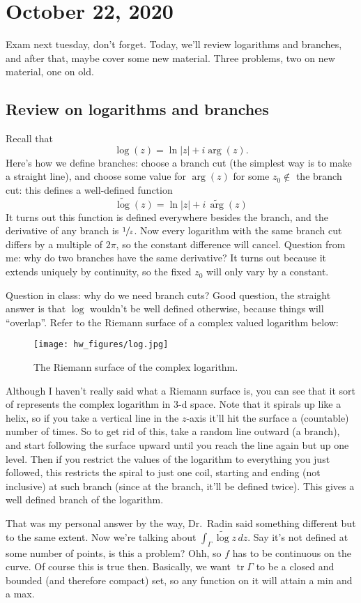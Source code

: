 \section{October 22, 2020}
Exam next tuesday, don't forget. Today, we'll review logarithms and branches, and after that, maybe cover some new material. Three problems, two on new material, one on old.
\subsection{Review on logarithms and branches}
Recall that \[
    \log(z)=\ln|z|+i \operatorname{arg}(z).
\] Here's how we define branches: choose a branch cut (the simplest way is to make a straight line), and choose some value for $\operatorname{arg}(z)$ for some $z_0\notin$ the branch cut: this defines a well-defined function \[
\widetilde{\log}(z)=\ln|z|+i\, \widetilde {\operatorname{arg}}(z)
\] It turns out this function is defined everywhere besides the branch, and the derivative of any branch is $\sfrac{1}{z}$. Now every logarithm with the same branch cut differs by a multiple of $2\pi$, so the constant difference will cancel. Question from me: why do two branches have the same derivative? It turns out because it extends uniquely by continuity, so the fixed $z_0$ will only vary by a constant.

Question in class: why do we need branch cuts? Good question, the straight answer is that $\log$ wouldn't be well defined otherwise, because things will ``overlap''. Refer to the Riemann surface of a complex valued logarithm below:
\begin{figure}[H]
\centering
        \texttt{[image: hw\_figures/log.jpg]}
        \caption{The Riemann surface of the complex logarithm.}
\end{figure}
Although I haven't really said what a Riemann surface is, you can see that it sort of represents the complex logarithm in $3$-d space. Note that it spirals up like a helix, so if you take a vertical line in the $z$-axis it'll hit the surface a (countable) number of times. So to get rid of this, take a random line outward (a branch), and start following the surface upward until you reach the line again but up one level. Then if you restrict the values of the logarithm to everything you just followed, this restricts the spiral to just one coil, starting and ending (not inclusive) at such branch (since at the branch, it'll be defined twice). This gives a well defined branch of the logarithm.

That was my personal answer by the way, Dr.\ Radin said something different but to the same extent. Now we're talking about $\int_{\Gamma }^{} \widetilde{\log}z \, dz$. Say it's not defined at some number of points, is this a problem? Ohh, so $f$ has to be continuous on the curve. Of course this is true then. Basically, we want $\operatorname{tr}\Gamma $ to be a closed and bounded (and therefore compact) set, so any function on it will attain a min and a max.
\orbreak
